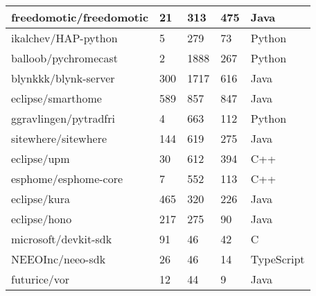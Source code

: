 \begin{table}
\begin{tabular}{|l|l|l|l|l|}
        freedomotic/freedomotic & 21 & 313 & 475 & Java \\ \hline
        ikalchev/HAP-python & 5 & 279 & 73 & Python \\ \hline
        balloob/pychromecast & 2 & 1888 & 267 & Python \\ \hline
        blynkkk/blynk-server & 300 & 1717 & 616 & Java \\ \hline
        eclipse/smarthome & 589 & 857 & 847 & Java \\ \hline
        ggravlingen/pytradfri & 4 & 663 & 112 & Python \\ \hline
        sitewhere/sitewhere & 144 & 619 & 275 & Java \\ \hline
        eclipse/upm & 30 & 612 & 394 & C++ \\ \hline
        esphome/esphome-core & 7 & 552 & 113 & C++ \\ \hline
        eclipse/kura & 465 & 320 & 226 & Java \\ \hline
        eclipse/hono & 217 & 275 & 90 & Java \\ \hline
        microsoft/devkit-sdk & 91 & 46 & 42 & C \\ \hline
        NEEOInc/neeo-sdk & 26 & 46 & 14 & TypeScript \\ \hline
        futurice/vor & 12 & 44 & 9 & Java \\ \hline
    \end{tabular}
\end{table}


